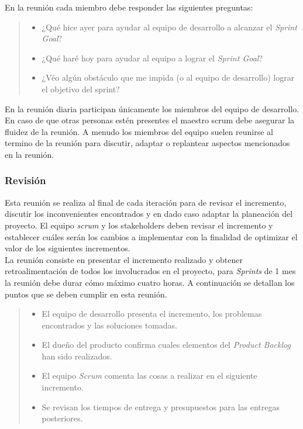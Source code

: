  En la reunión cada miembro debe responder las siguientes preguntas:

    \begin{quote}
    \begin{itemize}
    \item ¿Qué hice ayer para ayudar al equipo de desarrollo a alcanzar el {\it Sprint Goal}?
    \item ¿Qué haré hoy para ayudar al equipo a lograr el {\it Sprint Goal}?
    \item ¿Véo algún obstáculo que me impida (o al equipo de desarrollo) lograr el objetivo
           del sprint?
    \end{itemize}
    \end{quote}

 \noindent En la reunión diaria participan únicamente los miembros del equipo de desarrollo. En
 caso de que otras personas estén presentes el maestro scrum debe asegurar la fluidez de la reunión.
 A menudo los miembros del equipo suelen reunirse al termino de la reunión para discutir, adaptar
 o replantear aspectos mencionados en la reunión.

\subsubsection{Revisión}

 Esta reunión se realiza al final de cada iteración para de revisar el incremento, discutir los
 inconvenientes encontrados y en dado caso adaptar la planeación del proyecto. El equipo {\it scrum} 
 y los stakeholders deben revisar el incremento y establecer cuáles serán los cambios a implementar
 con la finalidad de optimizar el valor de los siguientes incrementos.\\

 \noindent La reunión consiste en presentar el incremento realizado y obtener retroalimentación de
 todos los involucrados en el proyecto, para {\it Sprints} de 1 mes la reunión debe durar cómo
 máximo cuatro horas. A continuación se detallan los puntos que se deben cumplir en esta reunión.

    \begin{quote}
    \begin{itemize}
    \item El equipo de desarrollo presenta el incremento, los problemas encontrados y las
            soluciones tomadas.

    \item El dueño del producto confirma cuales elementos del {\it Product Backlog} han sido
            realizados.

    \item El equipo {\it Scrum} comenta las cosas a realizar en el siguiente incremento.

    \item Se revisan los tiempos de entrega y presupuestos para las entregas posteriores.
    \end{itemize}
    \end{quote}


